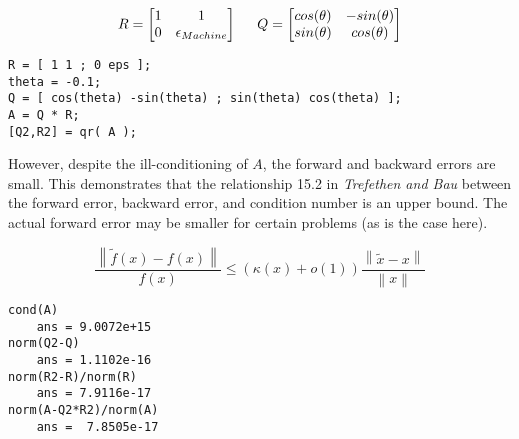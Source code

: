 \documentclass{article}
\begin{document}
\begin{equation}
R =
  \begin{bmatrix}
    1 & 1 \\
    0 & \epsilon_{Machine} \\
  \end{bmatrix}
\hspace{.2in}
Q = 
  \begin{bmatrix}
    cos(\theta) & -sin(\theta) \\
    sin(\theta) & cos(\theta) \\
  \end{bmatrix}
\label{eq2}
\end{equation}

\begin{framed}
\begin{verbatim}
R = [ 1 1 ; 0 eps ];
theta = -0.1;
Q = [ cos(theta) -sin(theta) ; sin(theta) cos(theta) ];
A = Q * R;
[Q2,R2] = qr( A );
\end{verbatim}
\end{framed}

However, despite the ill-conditioning of \(A\), the forward and backward errors are small. This demonstrates that the relationship 15.2 in \emph{Trefethen and Bau} between the forward error, backward error, and condition number is an upper bound. The actual forward error may be smaller for certain problems (as is the case here).

\begin{equation}
\frac{\left \| \tilde{f}\left(x\right)-f\left(x\right) \right \|}{f\left(x\right)}  \leq \left(\kappa\left(x\right)+o\left(1\right)\right)\frac{\left \| \tilde{x}-x \right \|}{\left \| x \right \|}
\label{eq3}
\end{equation}

\begin{framed}
\begin{verbatim}
cond(A)
    ans = 9.0072e+15
norm(Q2-Q)
    ans = 1.1102e-16
norm(R2-R)/norm(R)
    ans = 7.9116e-17
norm(A-Q2*R2)/norm(A)
    ans =  7.8505e-17
\end{verbatim}
\end{framed}
\end{document}
